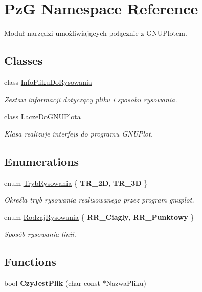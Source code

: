 \hypertarget{namespacePzG}{}\section{PzG Namespace Reference}
\label{namespacePzG}


Moduł narzędzi umożliwiających połącznie z G\+N\+U\+Plotem.  


\subsection*{Classes}
\begin{DoxyCompactItemize}
\item 
class \hyperlink{classPzG_1_1InfoPlikuDoRysowania}{Info\+Pliku\+Do\+Rysowania}
\begin{DoxyCompactList}\small\item\em Zestaw informacji dotyczący pliku i sposobu rysowania. \end{DoxyCompactList}\item 
class \hyperlink{classPzG_1_1LaczeDoGNUPlota}{Lacze\+Do\+G\+N\+U\+Plota}
\begin{DoxyCompactList}\small\item\em Klasa realizuje interfejs do programu G\+N\+U\+Plot. \end{DoxyCompactList}\end{DoxyCompactItemize}
\subsection*{Enumerations}
\begin{DoxyCompactItemize}
\item 
enum \hyperlink{namespacePzG_aeedae1ef10c66d720f9e89de408ca4ca}{Tryb\+Rysowania} \{ {\bfseries T\+R\+\_\+2D}, 
{\bfseries T\+R\+\_\+3D}
 \}\begin{DoxyCompactList}\small\item\em Określa tryb rysowania realizowanego przez program {\ttfamily gnuplot}. \end{DoxyCompactList}
\item 
enum \hyperlink{namespacePzG_a705c92106f39b7d0c34a6739d10ff0b6}{Rodzaj\+Rysowania} \{ {\bfseries R\+R\+\_\+\+Ciagly}, 
{\bfseries R\+R\+\_\+\+Punktowy}
 \}\begin{DoxyCompactList}\small\item\em Sposób rysowania linii. \end{DoxyCompactList}
\end{DoxyCompactItemize}
\subsection*{Functions}
\begin{DoxyCompactItemize}
\item 
\mbox{\label{namespacePzG_ae1ae4d36f66c77879380ba73da8e20e3}} 
bool {\bfseries Czy\+Jest\+Plik} (char const $\ast$Nazwa\+Pliku)
\end{DoxyCompactItemize}


